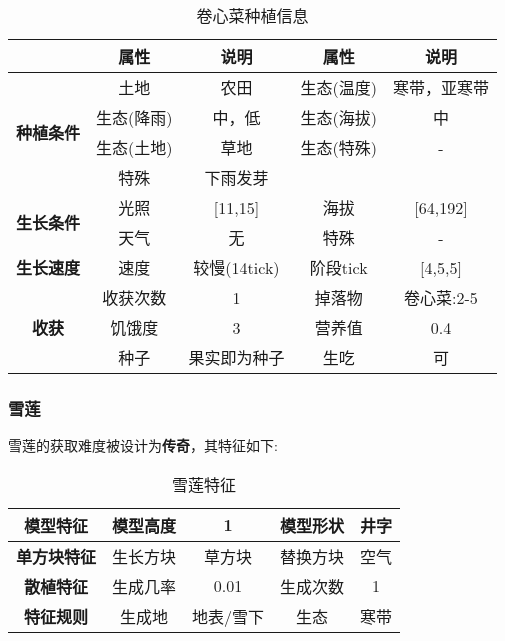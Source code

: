 \begin{table}[H]
    \centering
    \caption{卷心菜种植信息}
    \label{table:卷心菜种植信息}
    \setlength{\tabcolsep}{4mm}
    \begin{tabular}{c|cc|cc}
        \toprule
                                           & \textbf{属性} & \textbf{说明} & \textbf{属性} & \textbf{说明} \\
        \midrule
        \multirow{4}{*}{\textbf{种植条件}} & 土地          & 农田          & 生态(温度)    & 寒带，亚寒带    \\
                                           & 生态(降雨)    & 中，低        & 生态(海拔)    & 中            \\
                                           & 生态(土地)    & 草地          & 生态(特殊)    & -             \\
                                           & 特殊          & 下雨发芽                              \\
        \midrule
        \multirow{2}{*}{\textbf{生长条件}} & 光照          & [11,15]        & 海拔          & [64,192]      \\
                                           & 天气          & 无            & 特殊          & -             \\
        \midrule
        \textbf{生长速度}                  & 速度          & 较慢(14tick)     & 阶段tick      & [4,5,5]       \\
        \midrule
        \multirow{3}{*}{\textbf{收获}}     & 收获次数      & 1             & 掉落物        & 卷心菜:2-5      \\
                                           & 饥饿度        & 3             & 营养值        & 0.4           \\
                                           & 种子          & 果实即为种子  & 生吃          & 可 \\
        \bottomrule
    \end{tabular}
\end{table}

\subsubsection{雪莲}

雪莲的获取难度被设计为\textbf{传奇}，其特征如下:
\begin{table}[H]
    \centering
    \caption{雪莲特征}
    \label{table:雪莲特征}
    \setlength{\tabcolsep}{4mm}
    \begin{tabular}{c|cc|cc}
        \toprule
        \textbf{模型特征}   & 模型高度 & 1      & 模型形状 & 井字     \\
        \midrule
        \textbf{单方块特征} & 生长方块 & 草方块 & 替换方块 & 空气     \\
        \midrule
        \textbf{散植特征}   & 生成几率 & 0.01   & 生成次数 & 1        \\
        \midrule
        \textbf{特征规则}   & 生成地   & 地表/雪下   & 生态     & 寒带 \\
        \bottomrule
    \end{tabular}
\end{table}


